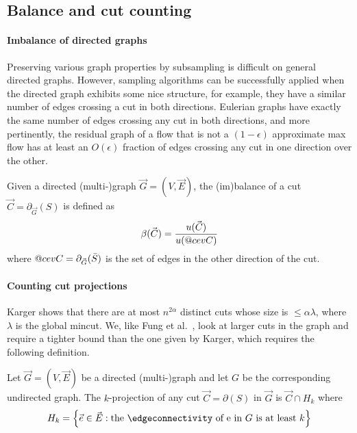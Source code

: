\documentclass[11pt,a4paper]{article}
\makeatletter
\newcommand{\eps}{\epsilon}
\DeclareRobustCommand{\cev}[1]{{\mathpalette\do@cev{#1}}}
\newcommand{\do@cev}[2]{\vbox{\offinterlineskip
    \sbox\z@{$\m@th#1 x$}\ialign{##\cr
      \hidewidth\reflectbox{$\m@th#1\vec{}\mkern4mu$}\hidewidth\cr
      \noalign{\kern-\ht\z@}
      $\m@th#1#2$\cr
    }}}
\makeatother
\begin{document}
\subsection{Balance and cut counting}
\label{sec:balancecutcounting}

\paragraph*{Imbalance of directed graphs}
Preserving various graph properties by subsampling is difficult on general directed graphs. However, sampling algorithms can be successfully applied when the directed graph exhibits some nice structure, for example, they have a similar number of edges crossing a cut in both directions. Eulerian graphs have exactly the same number of edges crossing any cut in both directions, and more pertinently, the residual graph of a flow that is not a $(1-\eps)$ approximate max flow has at least an $O(\eps)$ fraction of edges crossing any cut in one direction over the other.

\begin{definition}
\label{def:balance}
Given a directed (multi-)graph $\vec{G} = (V, \vec{E})$, the (im)balance of a cut $\vec{C} = \partial_{\vec{G}}(S)$ is defined as
\[
\beta(\vec{C})
= \frac{u(\vec{C})}{u(\cev{C})}
\] where $\cev{C} = \partial_{\vec{G}}(\bar{S})$ is the set of edges in the other direction of the cut.
\end{definition}

\paragraph*{Counting cut projections}
Karger shows that there are at most $n^{2\alpha}$ distinct cuts whose size is $\le \alpha \lambda$,
where $\lambda$ is the global mincut. We, like Fung et al.~\cite{FHHP19sparsification}, look at larger cuts in the graph and require a tighter bound than the one given by Karger, which requires the following definition.

\begin{definition}
\label{def:kprojection}
Let $\vec{G} = (V, \vec{E})$ be a directed (multi-)graph and let $G$ be the corresponding undirected graph. The $k$-projection of any cut $\vec{C} = \partial(S)$ in $\vec{G}$ is $\vec{C} \cap H_k$ where
\[
H_k = \left\{ \vec e \in \vec E: \text{the \edgeconnectivity of e in $G$ is at least $k$} \right\}
\]
\end{definition}
\end{document}
